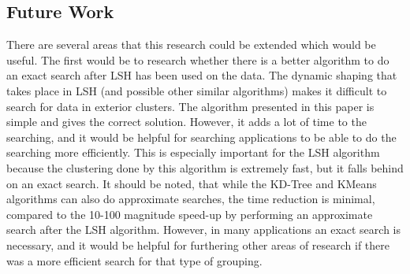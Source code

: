 \documentclass[journal]{IEEEtran}
\begin{document}
 \subsection{Future Work}
There are several areas that this research could be extended which would be useful. The first would be to research whether there is a better algorithm to do an exact search after LSH has been used on the data. The dynamic shaping that takes place in LSH (and possible other similar algorithms) makes it difficult to search for data in exterior clusters. The algorithm presented in this paper is simple and gives the correct solution. However, it adds a lot of time to the searching, and it would be helpful for searching applications to be able to do the searching more efficiently. This is especially important for the LSH algorithm because the clustering done by this algorithm is extremely fast, but it falls behind on an exact search. It should be noted, that while the KD-Tree and KMeans algorithms can also do approximate searches, the time reduction is minimal, compared to the 10-100 magnitude speed-up by performing an approximate search after the LSH algorithm. However, in many applications an exact search is necessary, and it would be helpful for furthering other areas of research if there was a more efficient search for that type of grouping.\par
\end{document}

